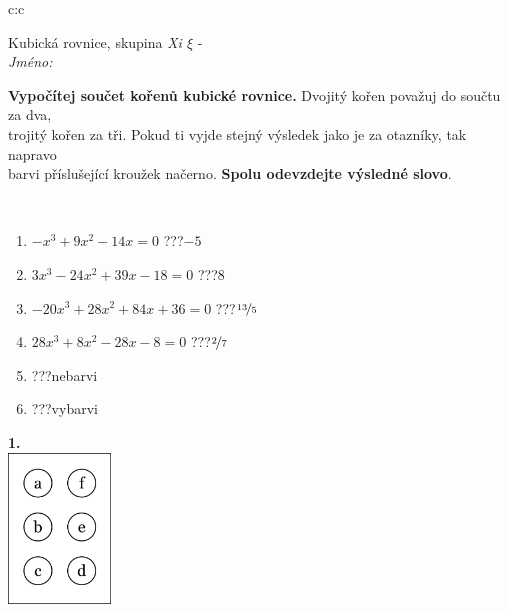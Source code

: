 \documentclass[10pt]{report}
\begin{document}
\begin{tabular}{c:c}
\begin{minipage}[c][104.5mm][t]{0.5\linewidth}
\begin{center}
\vspace{7mm}
{\huge Kubická rovnice, skupina \textit{Xi $\xi$} -}\\[5mm]
\textit{Jméno:}\phantom{xxxxxxxxxxxxxxxxxxxxxxxxxxxxxxxxxxxxxxxxxxxxxxxxxxxxxxxxxxxxxxxxx}\\[5mm]
\begin{minipage}{0.95\linewidth}
\begin{center}
\textbf{Vypočítej součet kořenů kubické rovnice.} Dvojitý kořen považuj do součtu za dva,\\trojitý kořen za tři. Pokud ti vyjde stejný výsledek jako je za otazníky, tak napravo\\barvi příslušející kroužek načerno. \textbf{Spolu odevzdejte výsledné slovo}.
\end{center}
\end{minipage}
\\[1mm]
\begin{minipage}{0.79\linewidth}
\begin{center}
\begin{varwidth}{\linewidth}
\begin{enumerate}
\Large
\item $-x^3+9x^2-14x=0$\quad \dotfill\; ???\;\dotfill \quad $-5$
\item $3x^3-24x^2+39x-18=0$\quad \dotfill\; ???\;\dotfill \quad $8$
\item $-20x^3+28x^2+84x+36=0$\quad \dotfill\; ???\;\dotfill \quad $\nicefrac{13}{5}$
\item $28x^3+8x^2-28x-8=0$\quad \dotfill\; ???\;\dotfill \quad $\nicefrac{2}{7}$
\item \quad \dotfill\; ???\;\dotfill \quad nebarvi
\item \quad \dotfill\; ???\;\dotfill \quad vybarvi
\end{enumerate}
\end{varwidth}
\end{center}
\end{minipage}
\begin{minipage}{0.20\linewidth}
\begin{center}
{\Huge\bfseries 1.} \\[2mm]
\includegraphics[height=40mm]{../images/braille.png}

\end{center}
\end{minipage}
\end{center}
\end{minipage}
\end{tabular}
\end{document}

